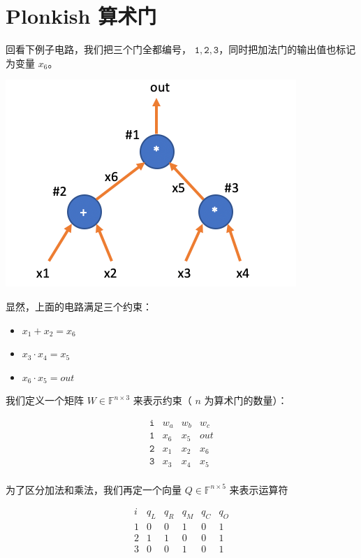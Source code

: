 \hypertarget{plonkish-ux7b97ux672fux95e8}{%
\section{Plonkish 算术门}\label{plonkish-ux7b97ux672fux95e8}}

回看下例子电路，我们把三个门全都编号，
\(\texttt{1},\texttt{2},\texttt{3}\)，同时把加法门的输出值也标记为变量
\(x_6\)。

\includegraphics{img/img20230414202348.png}

显然，上面的电路满足三个约束：

\begin{itemize}
\item
  \(x_1 + x_2 =x_6\)
\item
  \(x_3\cdot x_4 = x_5\)
\item
  \(x_6 \cdot x_5 = out\)
\end{itemize}

我们定义一个矩阵 \(W\in\mathbb{F}^{n\times 3}\) 来表示约束（ \(n\)
为算术门的数量）：

\[
\begin{array}{c|c|c|c|}
\texttt{i} & w_a & w_b & w_c  \\
\hline
\texttt{1} & x_6 & x_5 & out \\
\texttt{2} & x_1 & x_2 & x_6 \\
\texttt{3} & x_3 & x_4 & x_5 \\
\end{array}
\]

为了区分加法和乘法，我们再定一个向量 \(Q\in\mathbb{F}^{n\times5}\)
来表示运算符

$$
\begin{array}{c|c|c|c|cc}
i & q_L & q_R & q_M & q_C & q_O \\
\hline 1 & 0 & 0 & 1 & 0 & 1 \\
2 & 1 & 1 & 0 & 0 & 1 \\
3 & 0 & 0 & 1 & 0 & 1
\end{array}
$$

